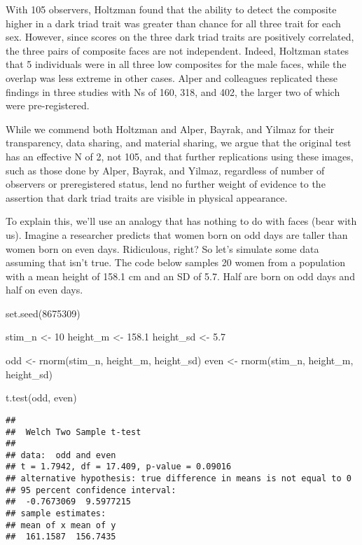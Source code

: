 \documentclass[
  doc,floatsintext]{apa6}
\newenvironment{Shaded}{\begin{snugshade}}{\end{snugshade}}
\newcommand{\DecValTok}[1]{\textcolor[rgb]{0.00,0.00,0.81}{#1}}
\newcommand{\FloatTok}[1]{\textcolor[rgb]{0.00,0.00,0.81}{#1}}
\newcommand{\FunctionTok}[1]{\textcolor[rgb]{0.00,0.00,0.00}{#1}}
\newcommand{\NormalTok}[1]{#1}
\newcommand{\OtherTok}[1]{\textcolor[rgb]{0.56,0.35,0.01}{#1}}
\begin{document}
With 105 observers, Holtzman found that the ability to detect the composite higher in a dark triad trait was greater than chance for all three trait for each sex. However, since scores on the three dark triad traits are positively correlated, the three pairs of composite faces are not independent. Indeed, Holtzman states that 5 individuals were in all three low composites for the male faces, while the overlap was less extreme in other cases. Alper and colleagues replicated these findings in three studies with Ns of 160, 318, and 402, the larger two of which were pre-registered.

While we commend both Holtzman and Alper, Bayrak, and Yilmaz for their transparency, data sharing, and material sharing, we argue that the original test has an effective N of 2, not 105, and that further replications using these images, such as those done by Alper, Bayrak, and Yilmaz, regardless of number of observers or preregistered status, lend no further weight of evidence to the assertion that dark triad traits are visible in physical appearance.

To explain this, we'll use an analogy that has nothing to do with faces (bear with us). Imagine a researcher predicts that women born on odd days are taller than women born on even days. Ridiculous, right? So let's simulate some data assuming that isn't true. The code below samples 20 women from a population with a mean height of 158.1 cm and an SD of 5.7. Half are born on odd days and half on even days.

\begin{Shaded}
\begin{Highlighting}[]
\FunctionTok{set.seed}\NormalTok{(}\DecValTok{8675309}\NormalTok{)}

\NormalTok{stim\_n }\OtherTok{\textless{}{-}} \DecValTok{10}
\NormalTok{height\_m }\OtherTok{\textless{}{-}} \FloatTok{158.1}
\NormalTok{height\_sd }\OtherTok{\textless{}{-}} \FloatTok{5.7}

\NormalTok{odd }\OtherTok{\textless{}{-}} \FunctionTok{rnorm}\NormalTok{(stim\_n, height\_m, height\_sd)}
\NormalTok{even }\OtherTok{\textless{}{-}} \FunctionTok{rnorm}\NormalTok{(stim\_n, height\_m, height\_sd)}

\FunctionTok{t.test}\NormalTok{(odd, even)}
\end{Highlighting}
\end{Shaded}

\begin{verbatim}
## 
##  Welch Two Sample t-test
## 
## data:  odd and even
## t = 1.7942, df = 17.409, p-value = 0.09016
## alternative hypothesis: true difference in means is not equal to 0
## 95 percent confidence interval:
##  -0.7673069  9.5977215
## sample estimates:
## mean of x mean of y 
##  161.1587  156.7435
\end{verbatim}
\end{document}
